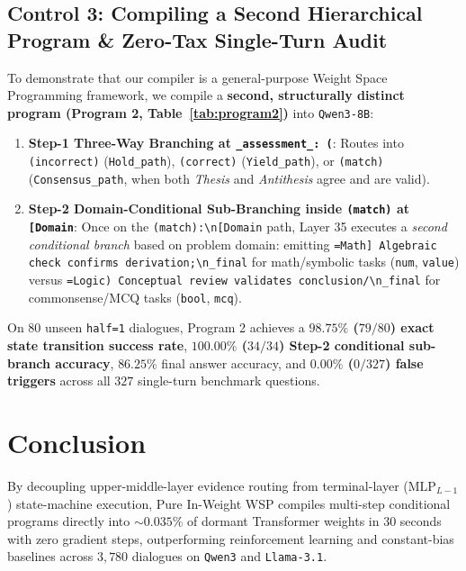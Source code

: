 \documentclass[10pt,twocolumn]{article}
\begin{document}
\subsection{Control 3: Compiling a Second Hierarchical Program \& Zero-Tax Single-Turn Audit}
To demonstrate that our compiler is a general-purpose Weight Space Programming framework, we compile a \textbf{second, structurally distinct program (Program 2, Table~\ref{tab:program2})} into \texttt{Qwen3-8B}:
\begin{enumerate}
    \item \textbf{Step-1 Three-Way Branching at \texttt{\_assessment\_: (}}: Routes into \texttt{(incorrect)} (\texttt{Hold\_path}), \texttt{(correct)} (\texttt{Yield\_path}), or \texttt{(match)} (\texttt{Consensus\_path}, when both \emph{Thesis} and \emph{Antithesis} agree and are valid).
    \item \textbf{Step-2 Domain-Conditional Sub-Branching inside \texttt{(match)} at \texttt{[Domain}}: Once on the \texttt{(match):\textbackslash n[Domain} path, Layer 35 executes a \emph{second conditional branch} based on problem domain: emitting \texttt{=Math] Algebraic check confirms derivation;\textbackslash n\_final} for math/symbolic tasks (\texttt{num}, \texttt{value}) versus \texttt{=Logic) Conceptual review validates conclusion/\textbackslash n\_final} for commonsense/MCQ tasks (\texttt{bool}, \texttt{mcq}).
\end{enumerate}
On $80$ unseen \texttt{half=1} dialogues, Program 2 achieves a \textbf{$98.75\%$ ($79/80$) exact state transition success rate}, \textbf{$100.00\%$ ($34/34$) Step-2 conditional sub-branch accuracy}, $86.25\%$ final answer accuracy, and \textbf{$0.00\%$ ($0/327$) false triggers} across all $327$ single-turn benchmark questions.

\section{Conclusion}
By decoupling upper-middle-layer evidence routing from terminal-layer ($\mathrm{MLP}_{L-1}$) state-machine execution, Pure In-Weight WSP compiles multi-step conditional programs directly into $\sim 0.035\%$ of dormant Transformer weights in $30$ seconds with zero gradient steps, outperforming reinforcement learning and constant-bias baselines across $3,780$ dialogues on \texttt{Qwen3} and \texttt{Llama-3.1}.
\end{document}

